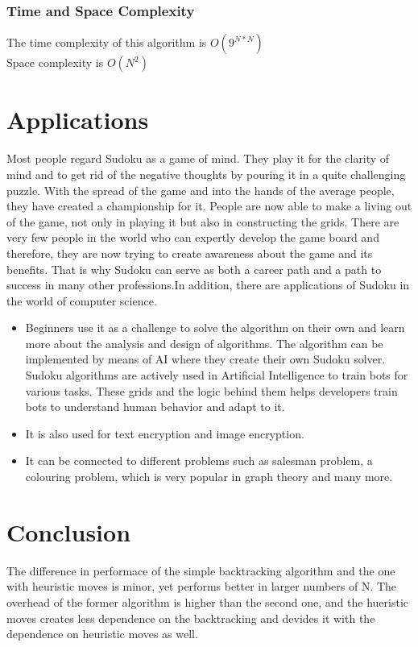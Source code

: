 \documentclass[12pt]{extarticle}
\theoremstyle{plain}
\begin{document}
\subsubsection*{Time and Space Complexity}

\noindent The time complexity of this algorithm is $O(9^{N*N})$\\
Space complexity is $O(N^2)$
\newpage
\section*{Applications}
Most people regard Sudoku as a game of mind. They play it for the clarity of mind and to get rid of the negative thoughts by pouring it in a quite challenging puzzle. With the spread of the game and into the hands of the average people, they have created a championship for it. People are now able to make a living out of the game, not only in playing it but also in constructing the grids. There are very few people in the world who can expertly develop the game board and therefore, they are now trying to create awareness about the game and its benefits. That is why Sudoku can serve as both a career path and a path to success in many other professions.In addition, there are applications of Sudoku in the world of computer science.

\begin{itemize}
    \item Beginners use it as a challenge to solve the algorithm on their own and learn more about the analysis and design of algorithms. The algorithm can be implemented by means of AI where they create their own Sudoku solver. Sudoku algorithms are actively used in Artificial Intelligence to train bots for various tasks. These grids and the logic behind them helps developers train bots to understand human behavior and adapt to it.
    \item It is also used for text encryption and image encryption.
    \item It can be connected to different problems such as salesman problem, a colouring problem, which is very popular in graph theory and many more.
\end{itemize}

\newpage
\section*{Conclusion}
The difference in performace of the simple backtracking algorithm and the one with heuristic moves is minor, yet performs better in larger numbers of N.
The overhead of the former algorithm is higher than the second one, and the hueristic moves creates less dependence on the backtracking and devides it with the dependence on heuristic moves as well.
\end{document}
